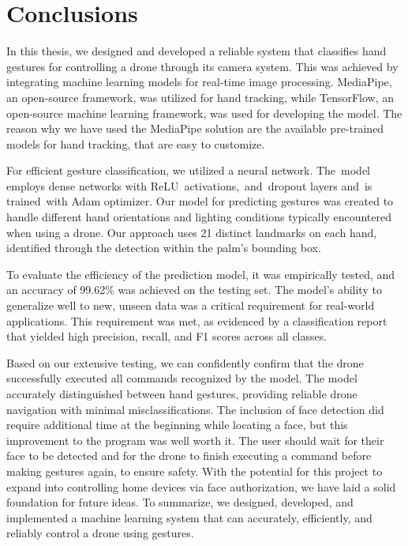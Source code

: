 \chapter{Conclusions}
In this thesis, we designed and developed
a reliable system that classifies hand gestures for controlling a drone through its camera system.
This was achieved by integrating machine learning models for real-time image processing. MediaPipe, an open-source framework, was utilized for hand tracking, while TensorFlow, an open-source machine learning framework, was used for developing the model. The reason why we have used the MediaPipe solution are the available pre-trained models for hand tracking, that are easy to customize.


For efficient gesture classification, we utilized a neural network. The model employs dense networks with ReLU activations, and dropout layers and is trained with Adam optimizer. Our model for predicting gestures was created to handle different hand orientations and lighting conditions typically encountered when using a drone. Our approach uses 21 distinct landmarks on each hand, identified through the detection within the palm's bounding box.   


To evaluate the efficiency of the prediction model, it was empirically tested, and an accuracy of 99.62\% was achieved on the testing set. The model's ability to generalize well to new, unseen data was a critical requirement for real-world applications. This requirement was met, as evidenced by a classification report that yielded high precision, recall, and F1 scores across all classes. 


Based on our extensive testing, we can confidently confirm that the drone successfully executed all commands recognized by the model. The model accurately distinguished between hand gestures, providing reliable drone navigation with minimal misclassifications. The inclusion of face detection did require additional time at the beginning while locating a face, but this improvement to the program was well worth it. The user should wait for their face to be detected and for the drone to finish executing a command before making gestures again, to ensure safety.  With the potential for this project to expand into controlling home devices via face authorization, we have laid a solid foundation for future ideas. To summarize, we designed, developed, and implemented a machine learning system that can accurately, efficiently, and reliably control a drone using gestures.

